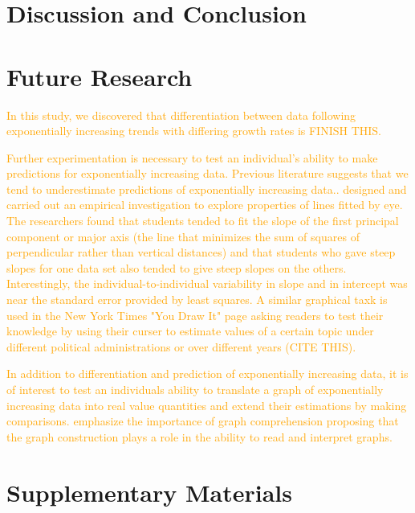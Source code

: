 \documentclass[]{interact}
\theoremstyle{plain}%
\theoremstyle{definition}
\theoremstyle{remark}
\begin{document}
\hypertarget{discussion-and-conclusion}{%
\section{Discussion and Conclusion}\label{discussion-and-conclusion}}

\hypertarget{future-research}{%
\section{Future Research}\label{future-research}}

\textcolor{Orange}{
In this study, we discovered that differentiation between data following exponentially increasing trends with differing growth rates is FINISH THIS.
}

\textcolor{Orange}{
Further experimentation is necessary to test an individual's ability to make predictions for exponentially increasing data. 
Previous literature suggests that we tend to underestimate predictions of exponentially increasing data.\citep{jones_generalized_1979, jones_polynomial_1977, wagenaar_extrapolation_1978}.
\citep{mosteller_eye_1981} designed and carried out an empirical investigation to explore properties of lines fitted by eye. 
The researchers found that students tended to fit the slope of the first principal component or major axis (the line that minimizes the sum of squares of perpendicular rather than vertical distances) and that students who gave steep slopes for one data set also tended to give steep slopes on the others. 
Interestingly, the individual-to-individual variability in slope and in intercept was near the standard error provided by least squares.
A similar graphical taxk is used in the New York Times "You Draw It" page asking readers to test their knowledge by using their curser to estimate values of a certain topic under different political administrations or over different years (CITE THIS).
}

\textcolor{Orange}{
In addition to differentiation and prediction of exponentially increasing data, it is of interest to test an individuals ability to translate a graph of exponentially increasing data into real value quantities and extend their estimations by making comparisons. 
\citep{friel_making_2001} emphasize the importance of graph comprehension proposing that the graph construction plays a role in the ability to read and interpret graphs.
}

\hypertarget{supplementary-materials}{%
\section*{Supplementary Materials}\label{supplementary-materials}}



\end{document}
